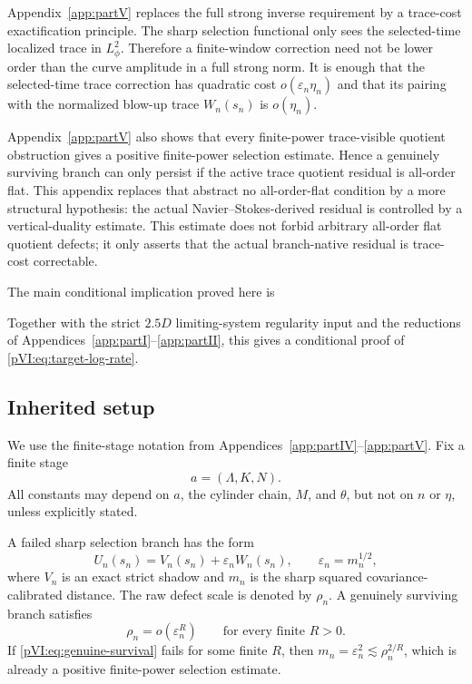 \documentclass[11pt]{article}
\numberwithin{equation}{section}
\theoremstyle{plain}
\theoremstyle{definition}
\theoremstyle{remark}
\newcommand{\eps}{\varepsilon}
\begin{document}
Appendix~\ref{app:partV} replaces the full strong inverse requirement by a trace-cost exactification principle.
The sharp selection functional only sees the selected-time localized trace in \(L^2_\phi\).  Therefore
a finite-window correction need not be lower order than the curve amplitude in a full strong norm.  It is
enough that the selected-time trace correction has quadratic cost \(o(\eps_n\eta_n)\) and that its
pairing with the normalized blow-up trace \(W_n(s_n)\) is \(o(\eta_n)\).

Appendix~\ref{app:partV} also shows that every finite-power trace-visible quotient obstruction gives a positive
finite-power selection estimate.  Hence a genuinely surviving branch can only persist if the active
trace quotient residual is all-order flat.  This appendix replaces that abstract no all-order-flat condition
by a more structural hypothesis: the actual Navier--Stokes-derived residual is controlled by a
vertical-duality estimate.  This estimate does not forbid arbitrary all-order flat quotient defects; it
only asserts that the actual branch-native residual is trace-cost correctable.

The main conditional implication proved here is
\begin{center}
\end{center}
Together with the strict \(2.5D\) limiting-system regularity input and the reductions of Appendices~\ref{app:partI}--\ref{app:partII},
this gives a conditional proof of \eqref{pVI:eq:target-log-rate}.

\subsection{Inherited setup}

We use the finite-stage notation from Appendices~\ref{app:partIV}--\ref{app:partV}.  Fix a finite stage
\[
        a=(\Lambda,K,N).
\]
All constants may depend on \(a\), the cylinder chain, \(M\), and \(\theta\), but not on \(n\) or
\(\eta\), unless explicitly stated.

A failed sharp selection branch has the form
\begin{equation}\label{pVI:eq:failed-branch}
        U_n(s_n)=V_n(s_n)+\eps_n W_n(s_n),
        \qquad
        \eps_n=m_n^{1/2},
\end{equation}
where \(V_n\) is an exact strict shadow and \(m_n\) is the sharp squared covariance-calibrated
distance.  The raw defect scale is denoted by \(\rho_n\).  A genuinely surviving branch satisfies
\begin{equation}\label{pVI:eq:genuine-survival}
        \rho_n=o(\eps_n^R)
        \qquad
        \text{for every finite }R>0.
\end{equation}
If \eqref{pVI:eq:genuine-survival} fails for some finite \(R\), then \(m_n=\eps_n^2\lesssim \rho_n^{2/R}\),
which is already a positive finite-power selection estimate.
\end{document}
